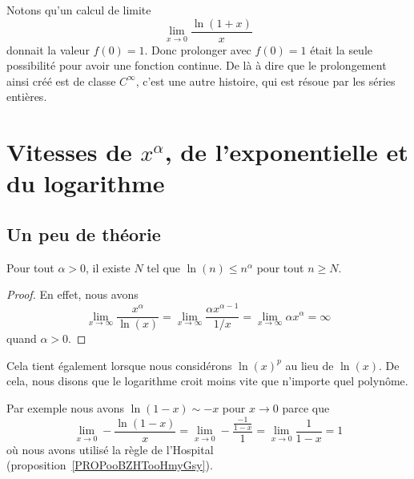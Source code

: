 Notons qu'un calcul de limite
\begin{equation}
    \lim_{x\to 0} \frac{ \ln(1+x) }{ x }
\end{equation}
donnait la valeur \( f(0)=1\). Donc prolonger avec \( f(0)=1\) était la seule possibilité pour avoir une fonction continue. De là à dire que le prolongement ainsi créé est de classe \(  C^{\infty}\), c'est une autre histoire, qui est résoue par les séries entières.

\section{Vitesses de $x^{\alpha}$, de l'exponentielle et du logarithme}

\subsection{Un peu de théorie}

\begin{lemma}   \label{LemSYHKooUiSMFJ}
    Pour tout \( \alpha>0\), il existe \( N\) tel que \( \ln(n)\leq n^{\alpha}\) pour tout \( n\geq N\).
\end{lemma}

\begin{proof}
En effet, nous avons
\begin{equation}
    \lim_{x\to\infty} \frac{ x^{\alpha} }{ \ln(x) }=\lim_{x\to\infty} \frac{ \alpha x^{\alpha-1} }{ 1/x }=\lim_{x\to\infty} \alpha x^{\alpha}=\infty
\end{equation}
quand $\alpha>0$.
\end{proof}
Cela tient également lorsque nous considérons $\ln(x)^p$ au lieu de $\ln(x)$. De cela, nous disons que le logarithme croit moins vite que n'importe quel polynôme.

\begin{example}
    Par exemple nous avons \( \ln(1-x)\sim -x\) pour \( x\to 0\) parce que
    \begin{equation}    \label{EqGICpOX}
        \lim_{x\to 0} -\frac{ \ln(1-x) }{ x }=\lim_{x\to 0} -\frac{ \frac{ -1 }{ 1-x } }{ 1 }=\lim_{x\to 0} \frac{1}{ 1-x }=1
    \end{equation}
    où nous avons utilisé la règle de l'Hospital (proposition~\ref{PROPooBZHTooHmyGsy}).
\end{example}

